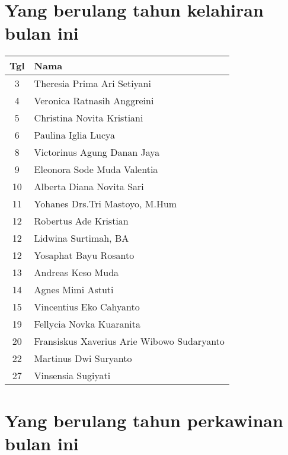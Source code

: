

\section*{Yang berulang tahun kelahiran bulan ini}


\begin{longtable}{|c|l|} 
\hline
Tgl & Nama \\ \hline
\endhead3& Theresia Prima Ari Setiyani\\
4& Veronica Ratnasih Anggreini\\
5& Christina Novita Kristiani\\
6& Paulina  Iglia Lucya\\
8& Victorinus Agung Danan Jaya\\
9& Eleonora Sode Muda Valentia\\
10& Alberta Diana Novita Sari\\
11& Yohanes Drs.Tri Mastoyo, M.Hum\\
12& Robertus Ade Kristian\\
12& Lidwina Surtimah, BA\\
12& Yosaphat Bayu Rosanto\\
13& Andreas Keso Muda\\
14& Agnes Mimi Astuti\\
15& Vincentius Eko Cahyanto\\
19& Fellycia Novka Kuaranita\\
20& Fransiskus Xaverius Arie Wibowo Sudaryanto\\
22& Martinus Dwi Suryanto\\
27& Vinsensia Sugiyati\\
\hline
\end{longtable}




\section*{Yang berulang tahun perkawinan  bulan ini}

